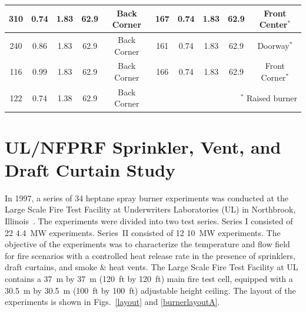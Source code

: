 \begin{table}
\begin{center}
\begin{tabular}{|c|c|c|c|c||c|c|c|c|c|}
310     & 0.74      & 1.83          &  62.9      & Back Corner  & 167   & 0.74      & 1.83        &  62.9         & Front Center$^*$    \\ \hline
240     & 0.86      & 1.83          &  62.9      & Back Corner  & 161   & 0.74      & 1.83        &  62.9         & Doorway$^*$         \\ \hline
116     & 0.99      & 1.83          &  62.9      & Back Corner  & 166   & 0.74      & 1.83        &  62.9         & Front Corner$^*$    \\ \hline
122     & 0.74      & 1.38          &  62.9      & Back Corner  &  \multicolumn{5}{r|}{$^*$ Raised burner}                   \\ \hline
\end{tabular}
\end{center}
\label{Steckler_Table}
\end{table}

\section{UL/NFPRF Sprinkler, Vent, and Draft Curtain Study}
\label{UL_NFPRF_Description}

In 1997, a series of 34 heptane spray burner experiments was conducted at the Large Scale Fire Test Facility at Underwriters Laboratories
(UL) in Northbrook, Illinois~\cite{Sheppard:1}. The experiments were divided into two test series. Series I consisted of 22 4.4~MW experiments. Series~II consisted
of 12 10~MW experiments. The objective of the experiments was to characterize the temperature and flow field for fire
scenarios with a controlled heat release rate in the presence of sprinklers, draft curtains, and smoke \& heat vents.
The Large Scale Fire Test Facility at UL contains a 37~m by 37~m (120~ft by 120~ft) main fire test cell, equipped with a 30.5~m by 30.5~m (100~ft by
100~ft) adjustable height ceiling. The layout of the experiments is shown in Figs.~\ref{layout} and \ref{burnerlayoutA}.

